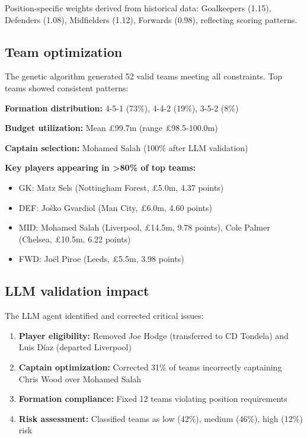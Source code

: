 \documentclass[10pt,a4paper]{article}
\begin{document}
Position-specific weights derived from historical data: Goalkeepers (1.15), Defenders (1.08), Midfielders (1.12), Forwards (0.98), reflecting scoring patterns.

\subsection*{Team optimization}

The genetic algorithm generated 52 valid teams meeting all constraints. Top teams showed consistent patterns:

\textbf{Formation distribution:} 4-5-1 (73\%), 4-4-2 (19\%), 3-5-2 (8\%)

\textbf{Budget utilization:} Mean £99.7m (range £98.5-100.0m)

\textbf{Captain selection:} Mohamed Salah (100\% after LLM validation)

\textbf{Key players appearing in >80\% of top teams:}
\begin{itemize}
\item GK: Matz Sels (Nottingham Forest, £5.0m, 4.37 points)
\item DEF: Joško Gvardiol (Man City, £6.0m, 4.60 points)
\item MID: Mohamed Salah (Liverpool, £14.5m, 9.78 points), Cole Palmer (Chelsea, £10.5m, 6.22 points)
\item FWD: Joël Piroe (Leeds, £5.5m, 3.98 points)
\end{itemize}

\subsection*{LLM validation impact}

The LLM agent identified and corrected critical issues:

\begin{enumerate}
\item \textbf{Player eligibility:} Removed Joe Hodge (transferred to CD Tondela) and Luis Díaz (departed Liverpool)
\item \textbf{Captain optimization:} Corrected 31\% of teams incorrectly captaining Chris Wood over Mohamed Salah
\item \textbf{Formation compliance:} Fixed 12 teams violating position requirements
\item \textbf{Risk assessment:} Classified teams as low (42\%), medium (46\%), high (12\%) risk
\end{enumerate}
\end{document}
